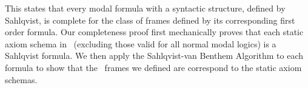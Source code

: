 This states that every modal formula with a syntactic structure, defined by Sahlqvist, is complete for the class of frames defined by its corresponding first order formula. Our completeness proof first mechanically proves that each static axiom schema in \DASL\ (excluding those valid for all normal modal logics) is a Sahlqvist formula. We then apply the Sahlqvist-van Benthem Algorithm to each formula to show that the \DASL\ frames we defined are correspond to the static axiom schemas.

%
%
%


